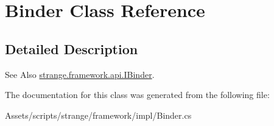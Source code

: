 \hypertarget{class_binder}{\section{Binder Class Reference}
\label{class_binder}
}


\subsection{Detailed Description}
\begin{DoxySeeAlso}{See Also}
\hyperlink{interfacestrange_1_1framework_1_1api_1_1_i_binder}{strange.\-framework.\-api.\-I\-Binder}. 
\end{DoxySeeAlso}


The documentation for this class was generated from the following file\-:\begin{DoxyCompactItemize}
\item 
Assets/scripts/strange/framework/impl/Binder.\-cs\end{DoxyCompactItemize}
